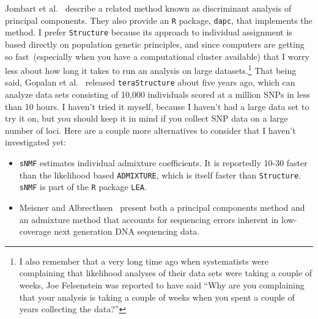Jombart et al.~\cite{Jombart-etal-2010} describe a related method
known as discriminant analysis of principal components. They also
provide an {\tt R} package, {\tt dapc}, that implements the
method. I prefer
{\tt Structure} because its approach to individual assignment is based
directly on population genetic principles, and since computers are
getting so fast~(especially when you have a computational cluster
available) that I worry less about how long it takes to run an
analysis on large datasets.\footnote{I also remember that a very long
  time ago when systematists were complaining that likelihood analyses
  of their data sets were taking a couple of weeks, Joe Felsenstein
  was reported to have said ``Why are you complaining that your
  analysis is taking a couple of weeks when you spent a couple of
  years collecting the data?''} That being said, Gopalan et
al.~\cite{Gopalan-etal-2016} released {\tt teraStructure} about five
years ago, which can analyze data sets consisting of 10,000
individuals scored at a million SNPs in less than 10
hours. I haven't tried it
myself, because I haven't had a large data set to try it on, but you
should keep it in mind if you collect SNP data on a large number of
loci. Here are a couple more alternatives to consider that I haven't
investigated yet:

\begin{itemize}

\item {\tt sNMF} estimates individual admixture coefficients. It is
  reportedly 10-30 faster than the likelihood based {\tt ADMIXTURE},
  which is itself faster than {\tt Structure}. {\tt sNMF} is part of
  the {\tt R} package {\tt LEA}.

\item Meisner and Albrecthsen~\cite{Meisner-Albrechtsen-2018} present
  both a principal components method and an admixture method that
  accounts for sequencing errors inherent in low-coverage next
  generation DNA sequencing data.

\end{itemize}

